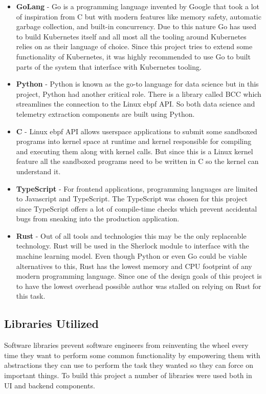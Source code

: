\begin{itemize}
    \item \textbf{GoLang} - Go is a programming language invented by Google that took a lot of inspiration from C but with modern features like memory safety, automatic garbage collection, and built-in concurrency. Due to this nature Go has used to build Kubernetes itself and all most all the tooling around Kubernetes relies on as their language of choice. Since this project tries to extend some functionality of Kubernetes, it was highly recommended to use Go to built parts of the system that interface with Kubernetes tooling.
    \item \textbf{Python} - Python is known as the go-to language for data science but in this project, Python had another critical role. There is a library called BCC which streamlines the connection to the Linux \ac{ebpf} API. So both data science and telemetry extraction components are built using Python.
    \item \textbf{C} - Linux \ac{ebpf} API allows userspace applications to submit some sandboxed programs into kernel space at runtime and kernel responsible for compiling and executing them along with kernel calls. But since this is a Linux kernel feature all the sandboxed programs need to be written in C so the kernel can understand it.
    \item \textbf{TypeScript} - For frontend applications, programming languages are limited to Javascript and TypeScript. The TypeScript was chosen for this project since TypeScript offers a lot of compile-time checks which prevent accidental bugs from sneaking into the production application.
    \item \textbf{Rust} - Out of all tools and technologies this may be the only replaceable technology. Rust will be used in the Sherlock module to interface with the machine learning model. Even though Python or even Go could be viable alternatives to this, Rust has the lowest memory and CPU footprint of any modern programming language. Since one of the design goals of this project is to have the lowest overhead possible author was stalled on relying on Rust for this task.
\end{itemize}



\subsection{Libraries Utilized}
Software libraries prevent software engineers from reinventing the wheel every time they want to perform some common functionality by empowering them with abstractions they can use to perform the task they wanted so they can force on important things. To build this project a number of libraries were used both in UI and backend components.


